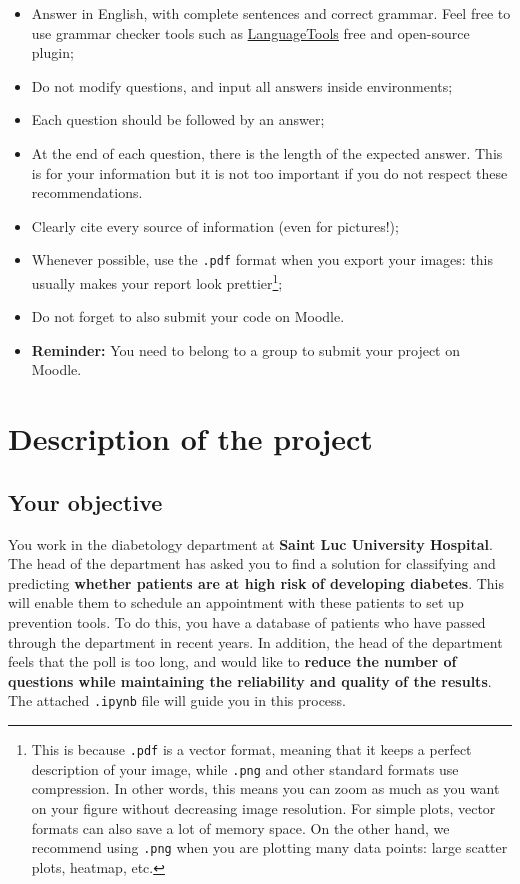 \documentclass [a4paper, 11pt] {article}
\begin{document}
    \begin{itemize}
        \item Answer in English, with complete sentences and correct grammar. Feel free to use grammar checker tools such as \href{https://languagetool.org/fr}{LanguageTools} free and open-source plugin;
        \item Do not modify questions, and input all answers inside  environments;
        \item Each question should be followed by an answer;
        \item At the end of each question, there is the length of the expected answer. This is for your information but it is not too important if you do not respect these recommendations.
        \item Clearly cite every source of information (even for pictures!);
        \item Whenever possible, use the \texttt{.pdf} format when you export your images: this usually makes your report look prettier\footnote{This is because \texttt{.pdf} is a vector format, meaning that it keeps a perfect description of your image, while \texttt{.png} and other standard formats use compression. In other words, this means you can zoom as much as you want on your figure without decreasing image resolution. For simple plots, vector formats can also save a lot of memory space. On the other hand, we recommend using \texttt{.png} when you are plotting many data points: large scatter plots, heatmap, etc.};
        \item Do not forget to also submit your code on Moodle.
        \item \textbf{Reminder:} You need to belong to a group to submit your project on Moodle.
    \end{itemize}

    {
    \hypersetup{allcolors=black}
    \tableofcontents
    }   
    \clearpage

\section{Description of the project}

\subsection{Your objective}

You work in the diabetology department at \textbf{Saint Luc University Hospital}. The head of the department has asked you to find a solution for classifying and predicting \textbf{whether patients are at high risk of developing diabetes}. This will enable them to schedule an appointment with these patients to set up prevention tools. To do this, you have a database of patients who have passed through the department in recent years. In addition, the head of the department feels that the poll is too long, and would like to \textbf{reduce the number of questions while maintaining the reliability and quality of the results}. The attached \texttt{.ipynb} file will guide you in this process.\\
\end{document}
